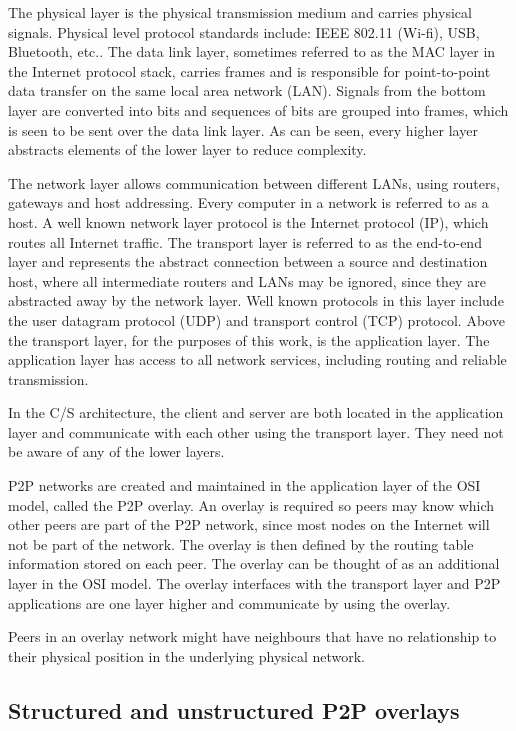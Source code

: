 The physical layer is the physical transmission medium and carries physical signals. Physical level protocol standards include: IEEE 802.11 (Wi-fi), USB, Bluetooth, etc.. The data link layer, sometimes referred to as the MAC layer in the Internet protocol stack, carries frames and is responsible for point-to-point data transfer on the same local area network (LAN). Signals from the bottom layer are converted into bits and sequences of bits are grouped into frames, which is seen to be sent over the data link layer. As can be seen, every higher layer abstracts elements of the lower layer to reduce complexity.

The network layer allows communication between different LANs, using routers, gateways and host addressing. Every computer in a network is referred to as a host. A well known network layer protocol is the Internet protocol (IP), which routes all Internet traffic. The transport layer is referred to as the end-to-end layer and represents the abstract connection between a source and destination host, where all intermediate routers and LANs may be ignored, since they are abstracted away by the network layer. Well known protocols in this layer include the user datagram protocol (UDP) and transport control (TCP) protocol. Above the transport layer, for the purposes of this work, is the application layer. The application layer has access to all network services, including routing and reliable transmission.

In the C/S architecture, the client and server are both located in the application layer and communicate with each other using the transport layer. They need not be aware of any of the lower layers.

P2P networks are created and maintained in the application layer of the OSI model, called the P2P overlay. An overlay is required so peers may know which other peers are part of the P2P network, since most nodes on the Internet will not be part of the network. The overlay is then defined by the routing table information stored on each peer. The overlay can be thought of as an additional layer in the OSI model. The overlay interfaces with the transport layer and P2P applications are one layer higher and communicate by using the overlay.

Peers in an overlay network might have neighbours that have no relationship to their physical position in the underlying physical network.

\subsection{Structured and unstructured P2P overlays}
\label{overlays}


